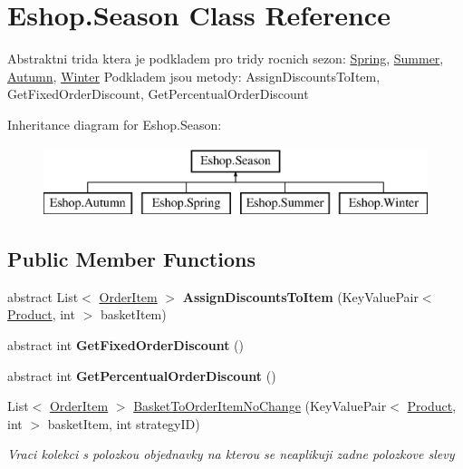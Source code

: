 \hypertarget{class_eshop_1_1_season}{}\section{Eshop.\+Season Class Reference}
\label{class_eshop_1_1_season}


Abstraktni trida ktera je podkladem pro tridy rocnich sezon\+: \mbox{\hyperlink{class_eshop_1_1_spring}{Spring}}, \mbox{\hyperlink{class_eshop_1_1_summer}{Summer}}, \mbox{\hyperlink{class_eshop_1_1_autumn}{Autumn}}, \mbox{\hyperlink{class_eshop_1_1_winter}{Winter}} Podkladem jsou metody\+: Assign\+Discounts\+To\+Item, Get\+Fixed\+Order\+Discount, Get\+Percentual\+Order\+Discount  


Inheritance diagram for Eshop.\+Season\+:\begin{figure}[H]
\begin{center}
\leavevmode
\includegraphics[height=2.000000cm]{class_eshop_1_1_season}
\end{center}
\end{figure}
\subsection*{Public Member Functions}
\begin{DoxyCompactItemize}
\item 
\mbox{\label{class_eshop_1_1_season_adaa1af009d4336f1911117b672608e68}} 
abstract List$<$ \mbox{\hyperlink{class_eshop_1_1_order_item}{Order\+Item}} $>$ {\bfseries Assign\+Discounts\+To\+Item} (Key\+Value\+Pair$<$ \mbox{\hyperlink{class_eshop_1_1_product}{Product}}, int $>$ basket\+Item)
\item 
\mbox{\label{class_eshop_1_1_season_a81c4ed1d11900e7d133a0a4b11bcbf76}} 
abstract int {\bfseries Get\+Fixed\+Order\+Discount} ()
\item 
\mbox{\label{class_eshop_1_1_season_a275a459997adf53f474908a0daf66c2c}} 
abstract int {\bfseries Get\+Percentual\+Order\+Discount} ()
\item 
List$<$ \mbox{\hyperlink{class_eshop_1_1_order_item}{Order\+Item}} $>$ \mbox{\hyperlink{class_eshop_1_1_season_a29ea0bffce6c50d8b463a30e6805e26f}{Basket\+To\+Order\+Item\+No\+Change}} (Key\+Value\+Pair$<$ \mbox{\hyperlink{class_eshop_1_1_product}{Product}}, int $>$ basket\+Item, int strategy\+ID)
\begin{DoxyCompactList}\small\item\em Vraci kolekci s polozkou objednavky na kterou se neaplikuji zadne polozkove slevy \end{DoxyCompactList}\end{DoxyCompactItemize}
